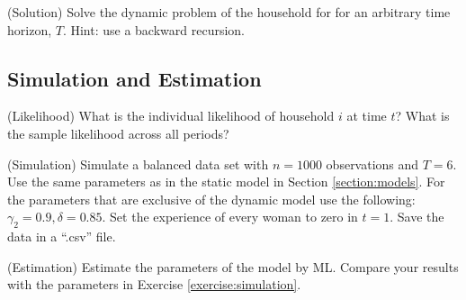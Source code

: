 \begin{exercise} (Solution)
Solve the dynamic problem of the household for for an arbitrary time horizon, $T$. Hint: use a backward recursion.
\end{exercise}

\subsection{Simulation and Estimation}

\begin{exercise} (Likelihood)
What is the individual likelihood of household $i$ at time $t$? What is the sample likelihood across all periods?
\end{exercise}

\begin{exercise} (Simulation) \label{exercise:simulation}
Simulate a balanced data set with $n = 1000$ observations and $T=6$. Use the same parameters as in the static model in Section \ref{section:models}. For the parameters that are exclusive of the dynamic model use the following: $\gamma_2 = 0.9,\delta = 0.85$. Set the experience of every woman to zero in $t=1$. Save the data in a ``.csv'' file.
\end{exercise}

\begin{exercise} (Estimation)
Estimate the parameters of the model by ML. Compare your results with the parameters in Exercise \ref{exercise:simulation}.
\end{exercise}